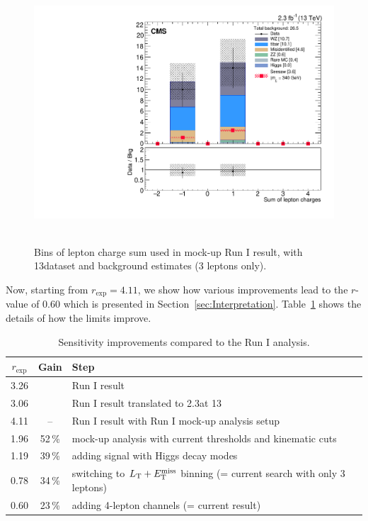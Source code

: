 \begin{figure}
\begin{center}
	\includegraphics[width=.7\textwidth]{Results/L3Tau0_Q}\
	\caption{Bins of lepton charge sum used in mock-up Run I result, with 13\TeV dataset and background estimates (3 leptons only).
	\label{fig:app:RunI}}
\end{center}
\end{figure}

Now, starting from $r_\textrm{exp} = 4.11$, we show how various improvements lead to the $r$-value of 0.60 which is presented in Section~\ref{sec:Interpretation}. Table~\ref{tab:improvements} shows the details of how the limits improve.

\begin{table}[h]
\centering
\caption{Sensitivity improvements compared to the Run I analysis.} \label{tab:improvements}
\begin{tabular}{c c l}
\hline\hline
$r_\textrm{exp}$ & Gain & Step \\
\hline
\hline
3.26 & & Run I result \\
3.06 & & Run I result translated to 2.3\fbinv at 13\TeV\\
\hline
4.11 & -- & Run I result with Run I mock-up analysis setup \\
1.96 & 52\,\% & mock-up analysis with current \pt thresholds and kinematic cuts \\
1.19 & 39\,\% & adding signal with Higgs decay modes \\
0.78 & 34\,\% & switching to $L_\textrm{T} + E_{\mathrm{T}}^{\text{miss}}$ binning (= current search with only 3 leptons) \\
0.60 & 23\,\% & adding 4-lepton channels (= current result) \\
\end{tabular}
\end{table}

